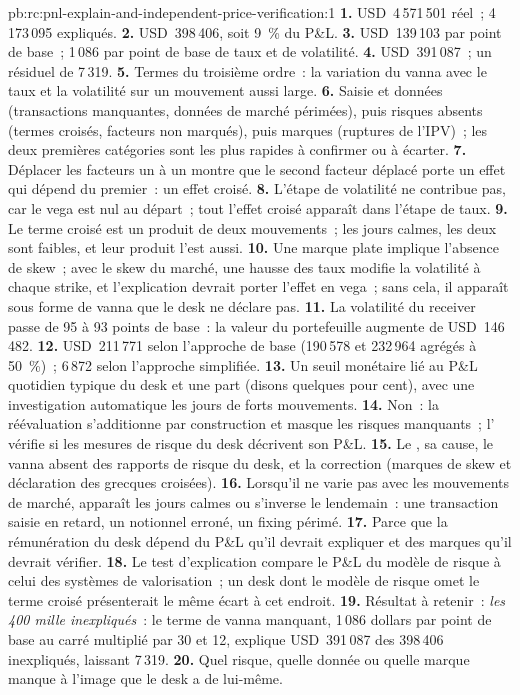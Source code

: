 \begin{solution}{pb:rc:pnl-explain-and-independent-price-verification:1}
\textbf{1.} USD~4\,571\,501 réel~; 4\,173\,095 expliqués.
\textbf{2.} USD~398\,406, soit 9~\% du P\&L.
\textbf{3.} USD~139\,103 par point de base~; 1\,086 par point de base de taux et de volatilité.
\textbf{4.} USD~391\,087~; un résiduel de 7\,319.
\textbf{5.} Termes du troisième ordre~: la variation du vanna avec le taux et la volatilité sur un mouvement aussi large.
\textbf{6.} Saisie et données (transactions manquantes, données de marché périmées), puis risques absents (termes croisés,
facteurs non marqués), puis marques (ruptures de l'IPV)~; les deux premières catégories sont les plus rapides à confirmer ou à écarter.
\textbf{7.} Déplacer les facteurs un à un montre que le second facteur déplacé porte un effet qui
dépend du premier~: un effet croisé.
\textbf{8.} L'étape de volatilité ne contribue pas, car le vega est nul au départ~; tout l'effet croisé
apparaît dans l'étape de taux.
\textbf{9.} Le terme croisé est un produit de deux mouvements~; les jours calmes, les deux sont faibles, et leur produit l'est aussi.
\textbf{10.} Une marque plate implique l'absence de skew~; avec le skew du marché, une hausse des taux modifie la volatilité à
chaque strike, et l'explication devrait porter l'effet en vega~; sans cela, il apparaît sous forme de vanna que le desk
ne déclare pas.
\textbf{11.} La volatilité du receiver passe de 95 à 93 points de base~: la valeur du portefeuille augmente de
USD~146\,482.
\textbf{12.} USD~211\,771 selon l'approche de base (190\,578 et 232\,964 agrégés à 50~\%)~; 6\,872 selon l'approche
simplifiée.
\textbf{13.} Un seuil monétaire lié au P\&L quotidien typique du desk et une part (disons quelques pour cent), avec
une investigation automatique les jours de forts mouvements.
\textbf{14.} Non~: la réévaluation s'additionne par construction et masque les risques manquants~; l' vérifie
si les mesures de risque du desk décrivent son P\&L.
\textbf{15.} Le , sa cause, le vanna absent des rapports de risque du desk, et la correction
(marques de skew et déclaration des grecques croisées).
\textbf{16.} Lorsqu'il ne varie pas avec les mouvements de marché, apparaît les jours calmes ou s'inverse le lendemain~: une
transaction saisie en retard, un notionnel erroné, un fixing périmé.
\textbf{17.} Parce que la rémunération du desk dépend du P\&L qu'il devrait expliquer et des marques qu'il devrait vérifier.
\textbf{18.} Le test d'explication compare le P\&L du modèle de risque à celui des systèmes de valorisation~; un desk dont
le modèle de risque omet le terme croisé présenterait le même écart à cet endroit.
\textbf{19.} Résultat à retenir~: \emph{les 400 mille inexpliqués}~: le terme de vanna manquant, 1\,086 dollars par point de base
au carré multiplié par 30 et 12, explique USD~391\,087 des 398\,406 inexpliqués, laissant 7\,319.
\textbf{20.} Quel risque, quelle donnée ou quelle marque manque à l'image que le desk a de lui-même.
\end{solution}

